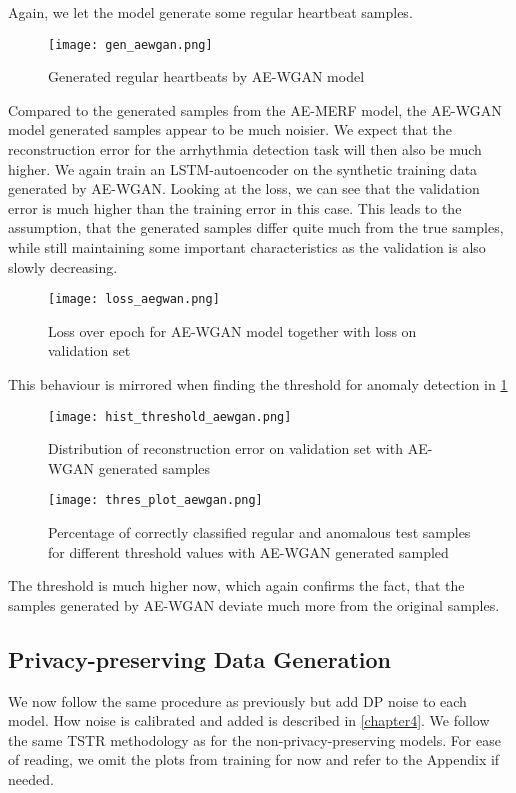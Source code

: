 Again, we let the model generate some regular heartbeat samples.
\begin{figure}[H]
    \centering
    \texttt{[image: gen\_aewgan.png]}
    \caption{Generated regular heartbeats by AE-WGAN model}
\end{figure}

Compared to the generated samples from the AE-MERF model, the AE-WGAN model generated samples appear to be much noisier. We expect that the reconstruction error for the arrhythmia detection task will then also be much higher. We again train an LSTM-autoencoder on the synthetic training data generated by AE-WGAN. Looking at the loss, we can see that the validation error is much higher than the training error in this case. This leads to the assumption, that the generated samples differ quite much from the true samples, while still maintaining some important characteristics as the validation is also slowly decreasing.

\begin{figure}[H]
    \centering
    \texttt{[image: loss\_aegwan.png]}
    \caption{Loss over epoch for AE-WGAN model together with loss on validation set}
\end{figure}

This behaviour is mirrored when finding the threshold for anomaly detection in \cref{fig:thres_aegwan}
\begin{figure}[h]
    \begin{minipage}[b]{0.45\textwidth}
        \centering
        \texttt{[image: hist\_threshold\_aewgan.png]}
        \caption{Distribution of reconstruction error on validation set with AE-WGAN generated samples}
        \label{fig:enter-label}
    \end{minipage}
    \begin{minipage}[b]{0.45\textwidth}
        \centering
        \texttt{[image: thres\_plot\_aewgan.png]}
        \caption{Percentage of correctly classified regular and anomalous test samples for different threshold values with AE-WGAN generated sampled}
        \label{fig:thres_aegwan}
    \end{minipage}
\end{figure}

The threshold is much higher now, which again confirms the fact, that the samples generated by AE-WGAN deviate much more from the original samples.

\subsection{Privacy-preserving Data Generation}
We now follow the same procedure as previously but add DP noise to each model. How noise is calibrated and added is described in \cref{chapter4}. We follow the same TSTR methodology as for the non-privacy-preserving models. For ease of reading, we omit the plots from training for now and refer to the Appendix if needed. 

